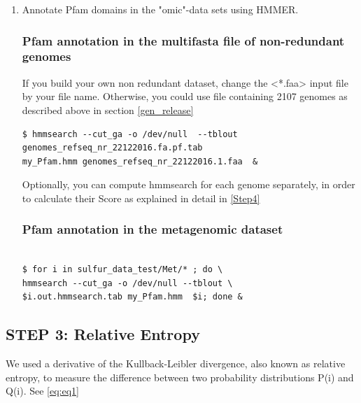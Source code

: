 \documentclass[12pt]{report}
\begin{document}
\begin{enumerate}
\begin{verbatim}
$ perl scripts/extract_hmms.pl 

# Pfam
# hmms = 112 #pfam version 30. 
\end{verbatim}
This will generate an output file named '\verb+my_Pfam.hmm+. We have compressed the file, which is provided precomputed at \verb+sulfur_data_tes/my_Pfam.hmm.bz2+

Note that Superfamily and TIGRFAM HMMs can also be used, but are commented out in the script since in our tests they produced huge outfiles (SF) or largely redundant with Pfam (TIGR).

\item Annotate Pfam domains in the "omic"-data sets using HMMER.

\label{hmmsearch-gen}
\subsubsection*{Pfam annotation in the multifasta file of non-redundant genomes }
If you build your own non redundant dataset, change the <*.faa> input file by your file name. Otherwise, you could use file containing 2107 genomes as described above in section  \ref{gen_release}
\begin{verbatim}
$ hmmsearch --cut_ga -o /dev/null  --tblout 
genomes_refseq_nr_22122016.fa.pf.tab  
my_Pfam.hmm genomes_refseq_nr_22122016.1.faa  & 
\end{verbatim}

Optionally, you can compute  hmmsearch for each genome separately, in order to calculate their Score as explained in detail in \ref{Step4} 

\subsubsection*{Pfam annotation in the metagenomic dataset}  
\begin{verbatim}

$ for i in sulfur_data_test/Met/* ; do \ 
hmmsearch --cut_ga -o /dev/null --tblout \
$i.out.hmmsearch.tab my_Pfam.hmm  $i; done &
\end{verbatim}
\end{enumerate}


\subsection{STEP 3: Relative Entropy}
\label{Step 3}

We used a derivative of the Kullback-Leibler divergence, also known as relative entropy, to measure the difference between two probability
distributions P(i) and Q(i). See \ref{eq:eq1}
\end{document}
